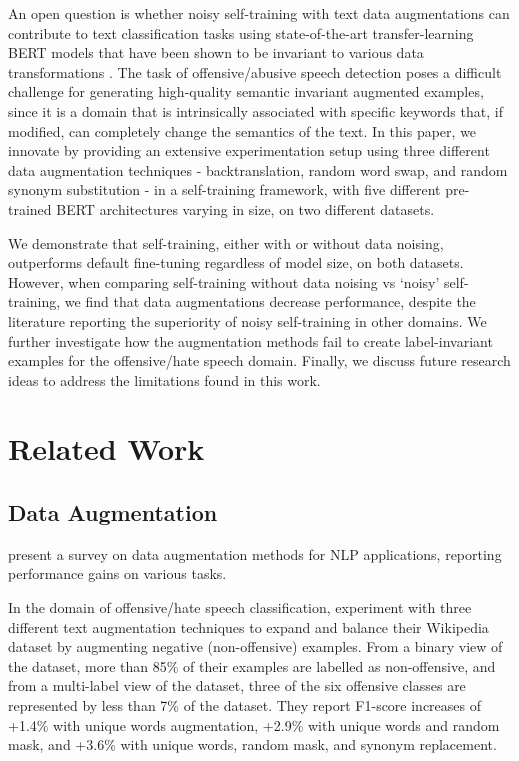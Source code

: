\documentclass[11pt,a4paper]{article}
\begin{document}
An open question is whether noisy self-training with text data augmentations can contribute to text classification tasks using state-of-the-art transfer-learning BERT models that have been shown to be invariant to various data transformations \citep{longpre-etal-2020-effective}. The task of offensive/abusive speech detection poses a difficult challenge for generating high-quality semantic invariant augmented examples, since it is a domain that is intrinsically associated with specific keywords that, if modified, can completely change the semantics of the text. In this paper, we innovate by providing an extensive experimentation setup using three different data augmentation techniques - backtranslation, random word swap, and random synonym substitution - in a self-training framework, with five different pre-trained BERT architectures varying in size, on two different datasets. 

We demonstrate that self-training, either with or without data noising, outperforms default fine-tuning regardless of model size, on both datasets. However, when comparing self-training without data noising vs `noisy' self-training, we find that data augmentations decrease performance, despite the literature reporting the superiority of noisy self-training in other domains. We further investigate how the augmentation methods fail to create label-invariant examples for the offensive/hate speech domain. Finally, we discuss future research ideas to address the limitations found in this work.

\section{Related Work}

\subsection{Data Augmentation} \label{ref:related_work_data_aug}
\citet{bayer2022survey} present a survey on data augmentation methods for NLP applications, reporting performance gains on various tasks.

In the domain of offensive/hate speech classification, \citet{imbalancedtoxic} experiment with three different text augmentation techniques to expand and balance their Wikipedia dataset by augmenting negative (non-offensive) examples. From a binary view of the dataset, more than 85\% of their examples are labelled as non-offensive, and from a multi-label view of the dataset, three of the six offensive classes are represented by less than 7\% of the dataset. They report F1-score increases of +1.4\% with unique words augmentation, +2.9\% with unique words and random mask, and +3.6\% with unique words, random mask, and synonym replacement.
\end{document}
